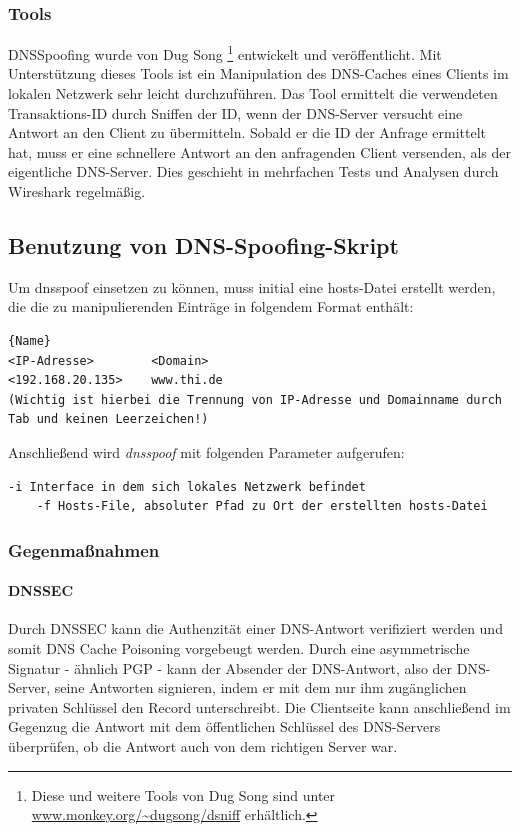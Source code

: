 \subsubsection*{Tools}
DNSSpoofing wurde von Dug Song \footnote{Diese und weitere Tools von Dug Song sind unter \url{www.monkey.org/~dugsong/dsniff} erhältlich.} entwickelt und veröffentlicht. Mit Unterstützung dieses Tools ist ein Manipulation des DNS-Caches eines Clients im lokalen
Netzwerk sehr leicht durchzuführen. Das Tool ermittelt die verwendeten Transaktions-ID durch Sniffen der ID, wenn der DNS-Server versucht eine Antwort an den Client zu übermitteln. Sobald er die ID der
Anfrage ermittelt hat, muss er eine schnellere Antwort an den anfragenden Client versenden, als der eigentliche DNS-Server. Dies geschieht in mehrfachen Tests und Analysen durch Wireshark regelmäßig. \\

\subsection*{Benutzung von DNS-Spoofing-Skript}
Um dnsspoof einsetzen zu können, muss initial eine hosts-Datei erstellt werden, die die zu manipulierenden Einträge in folgendem Format enthält: \newline

\begin{lstlisting}[caption=Beispiel für eine Hosts-Datei]{Name}
<IP-Adresse>		<Domain>
<192.168.20.135>	www.thi.de
(Wichtig ist hierbei die Trennung von IP-Adresse und Domainname durch Tab und keinen Leerzeichen!)
\end{lstlisting}

Anschließend wird \textit{dnsspoof} mit folgenden Parameter aufgerufen: \newline

\begin{lstlisting}[caption=Parameter für dnsspoof]
	-i Interface in dem sich lokales Netzwerk befindet
	-f Hosts-File, absoluter Pfad zu Ort der erstellten hosts-Datei
\end{lstlisting}
	


\subsubsection*{Gegenmaßnahmen}

\paragraph*{DNSSEC}
Durch DNSSEC kann die Authenzität einer DNS-Antwort verifiziert werden und somit DNS Cache Poisoning vorgebeugt werden. Durch eine asymmetrische Signatur -  ähnlich PGP - kann der Absender
der DNS-Antwort, also der DNS-Server, seine Antworten signieren, indem er mit dem nur ihm zugänglichen privaten Schlüssel den Record unterschreibt. Die Clientseite kann anschließend im 
Gegenzug die Antwort mit dem öffentlichen Schlüssel des DNS-Servers überprüfen, ob die Antwort auch von dem richtigen Server war.\newpage

